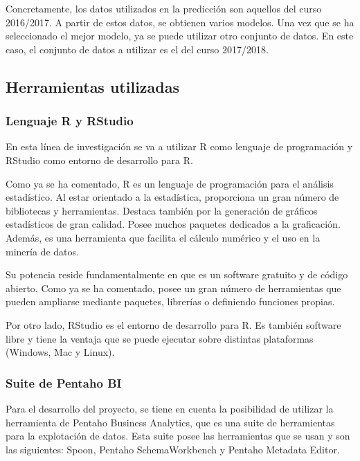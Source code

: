 Concretamente, los datos utilizados en la predicción son aquellos del curso 2016/2017. A partir de estos datos, se obtienen varios modelos. Una vez que se ha seleccionado el mejor modelo, ya se puede utilizar otro conjunto de datos. En este caso, el conjunto de datos a utilizar es el del curso 2017/2018.



\subsection{Herramientas utilizadas}
\subsubsection{Lenguaje R y RStudio}
En esta línea de investigación se va a utilizar R como lenguaje de programación y RStudio como entorno de desarrollo para R.

Como ya se ha comentado, R es un lenguaje de programación para el análisis estadístico. Al estar orientado a la estadística, proporciona un gran número de bibliotecas y herramientas. Destaca también por la generación de gráficos estadísticos de gran calidad. Posee muchos paquetes dedicados a la graficación. Además, es una herramienta que facilita el cálculo numérico y el uso en la minería de datos. \cite{emanuel2014}

Su potencia reside fundamentalmente en que es un software gratuito y de código abierto. Como ya se ha comentado, posee un gran número de herramientas que pueden ampliarse mediante paquetes, librerías o definiendo funciones propias.

Por otro lado, RStudio es el entorno de desarrollo para R. Es también software libre y tiene la ventaja que se puede ejecutar sobre distintas plataformas (Windows, Mac y Linux).

\subsubsection{Suite de Pentaho BI}
Para el desarrollo del proyecto, se tiene en cuenta la posibilidad de utilizar la herramienta de Pentaho Business Analytics, que es una suite de herramientas para la explotación de datos. Esta suite posee las herramientas que se usan y son las siguientes: Spoon, Pentaho SchemaWorkbench y Pentaho Metadata Editor.

